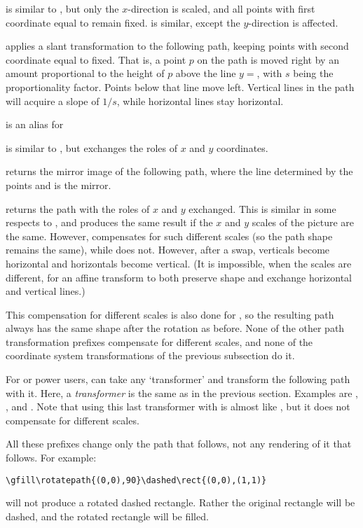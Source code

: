 \documentclass[letterpaper]{article}
\begin{document}
 is similar to , but only the $x$-direction
is scaled, and all points with first coordinate equal to  remain
fixed.  is similar, except the $y$-direction is affected.

 applies a slant transformation to the following path,
keeping points with second coordinate equal to  fixed. That is,
a point $p$ on the path is moved right by an amount proportional to the
height of $p$ above the line $y={}$, with $s$ being the
proportionality factor. Points below that line move left. Vertical lines
in the path will acquire a slope of $1/s$, while horizontal lines stay
horizontal.

 is an alias for 

 is similar to , but exchanges the roles
of $x$ and $y$ coordinates.

 returns the mirror image of the following path, where
the line determined by the points  and  is the
mirror.

 returns the path with the roles of $x$ and $y$
exchanged. This is similar in some respects to
, and produces the same result if the
$x$ and $y$ scales of the picture are the same. However,
 compensates for such different scales (so the path
shape remains the same), while  does not. However, after
a swap, verticals become horizontal and horizontals become vertical.
(It is impossible, when the scales are different, for an affine transform
to both preserve shape and exchange horizontal and vertical lines.)

This compensation for different scales is also done for ,
so the resulting path always has the same shape after the rotation as
before. None of the other path transformation prefixes compensate for
different scales, and none of the coordinate system transformations of
the previous subsection do it.

For \MF{} or \MP{} power users,  can take any
`transformer' and transform the following path with it. Here, a
\emph{transformer} is the same as in the previous section. Examples are
, , and . Note that
using this last transformer with  is almost like
, but it does not compensate for different
scales.

All these prefixes change only the path that follows, not any rendering
of it that follows. For example:
\begin{verbatim}
\gfill\rotatepath{(0,0),90}\dashed\rect{(0,0),(1,1)}
\end{verbatim}
will not produce a rotated dashed rectangle. Rather the original
rectangle will be dashed, and the rotated rectangle will be filled.
\end{document}
